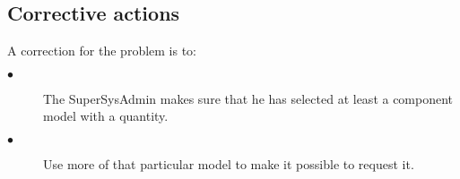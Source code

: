 \subsection{Corrective actions}

A correction for the problem is to:\\
\begin{description}
\item[$\bullet$] The SuperSysAdmin makes sure that he has selected at least a
component model with a quantity.
\item[$\bullet$] Use more of that particular model to make it possible to
request it.
\end{description}
